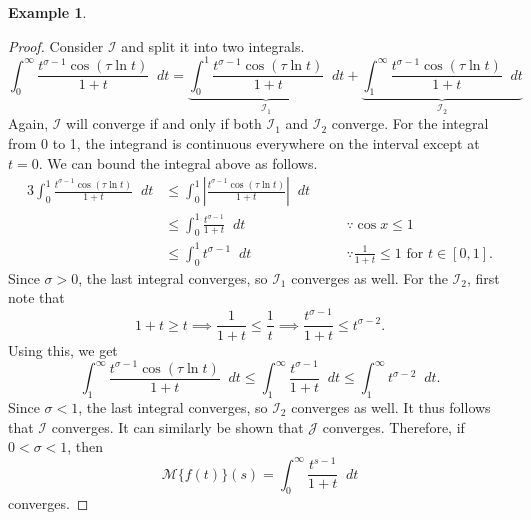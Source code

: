 \documentclass[a4paper]{article}
\newcommand*\diff{\mathop{}\!d} %
\theoremstyle{definition}
\newtheorem{example}[theorem]{Example}
\begin{document}
\begin{example}
\begin{proof}
        Consider $\mathcal{I}$ and split it into two integrals.
        \begin{equation*}
            \int_0^\infty \frac{t^{\sigma-1} \cos(\tau \ln t)}{1+t} \diff t = \underbrace{\int_0^1 \frac{t^{\sigma-1} \cos(\tau \ln t)}{1+t} \diff t}_{\mathcal{I}_1} + \underbrace{\int_1^\infty \frac{t^{\sigma-1} \cos(\tau \ln t)}{1+t} \diff t}_{\mathcal{I}_2}
        \end{equation*}
        Again, $\mathcal{I}$ will converge if and only if both $\mathcal{I}_1$ and $\mathcal{I}_2$ converge.
        For the integral from 0 to 1, the integrand is continuous everywhere on the interval except at $t=0$.
        We can bound the integral above as follows.
        \begin{alignat*}{3}
            \int_0^1 \frac{t^{\sigma-1} \cos(\tau \ln t)}{1+t} \diff t & \leq \int_0^1 \left\lvert \frac{t^{\sigma-1} \cos(\tau \ln t)}{1+t} \right\rvert \diff t \quad &  &                                                         \\
                                                                       & \leq \int_0^1 \frac{t^{\sigma-1}}{1+t} \diff t \qquad                                          &  & \because \cos x \leq 1                                  \\
                                                                       & \leq \int_0^1 t^{\sigma-1} \diff t \qquad                                                      &  & \because \frac{1}{1+t} \leq 1 \text{ for } t \in [0,1].
        \end{alignat*}
        Since $\sigma>0$, the last integral converges, so $\mathcal{I}_1$ converges as well.
        For the $\mathcal{I}_2$, first note that
        \begin{equation*}
            1+t \geq t \implies \frac{1}{1+t} \leq \frac{1}{t} \implies \frac{t^{\sigma-1}}{1+t} \leq t^{\sigma-2}.
        \end{equation*}
        Using this, we get
        \begin{equation*}
            \int_1^\infty \frac{t^{\sigma-1} \cos(\tau \ln t)}{1+t} \diff t \leq \int_1^\infty \frac{t^{\sigma-1}}{1+t} \diff t \leq \int_1^\infty t^{\sigma-2} \diff t.
        \end{equation*}
        Since $\sigma < 1$, the last integral converges, so $\mathcal{I}_2$ converges as well.
        It thus follows that $\mathcal{I}$ converges.
        It can similarly be shown that $\mathcal{J}$ converges.
        Therefore, if $0 < \sigma < 1$, then
        \begin{equation*}
            \mathcal{M}\{f(t)\}(s) = \int_0^\infty \frac{t^{s-1}}{1+t} \diff t
        \end{equation*}
        converges.


\end{proof}
\end{example}
\end{document}
